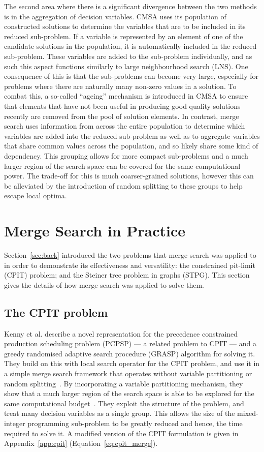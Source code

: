 \documentclass[journal]{IEEEtran}
\begin{document}
The second area where there is a significant divergence between the two methods is in the aggregation of decision variables. CMSA uses its population of constructed solutions to determine the variables that are to be included in its reduced sub-problem. If a variable is represented by an element of one of the candidate solutions in the population, it is automatically included in the reduced sub-problem. These variables are added to the sub-problem individually, and as such this aspect functions similarly to large neighbourhood search (LNS). One consequence of this is that the sub-problems can become very large, especially for problems where there are naturally many non-zero values in a solution. To combat this, a so-called ``ageing'' mechanism is introduced in CMSA to ensure that elements that have not been useful in producing good quality solutions recently are removed from the pool of solution elements. In contrast, merge search uses information from across the entire population to determine which variables are added into the reduced sub-problem as well as to aggregate variables that share common values across the population, and so likely share some kind of dependency. This grouping allows for more compact sub-problems and a much larger region of the search space can be covered for the same computational power. The trade-off for this is much coarser-grained solutions, however this can be alleviated by the introduction of random splitting to these groups to help escape local optima.

\section{Merge Search in Practice}\label{sec:pract}
Section~\ref{sec:back} introduced the two problems that merge search was applied to in order to demonstrate its effectiveness and versatility: the constrained pit-limit (CPIT) problem; and the Steiner tree problem in graphs (STPG). This section gives the details of how merge search was applied to solve them.

\subsection{The CPIT problem}

Kenny et al. \cite{gecco17} describe a novel representation for the precedence constrained production scheduling problem (PCPSP) --- a related problem to CPIT --- and a greedy randomised adaptive search procedure (GRASP) algorithm for solving it. They build on this with local search operator for the CPIT problem, and use it in a simple merge search framework that operates without variable partitioning or random splitting~\cite{gecco18}. By incorporating a variable partitioning mechanism, they show that a much larger region of the search space is able to be explored for the same computational budget~\cite{gecco19}. They exploit the structure of the problem, and treat many decision variables as a single group. This allows the size of the mixed-integer programming sub-problem to be greatly reduced and hence, the time required to solve it. A modified version of the CPIT formulation is given in Appendix~\ref{app:cpit} (Equation~\ref{eq:cpit_merge}).
\end{document}
